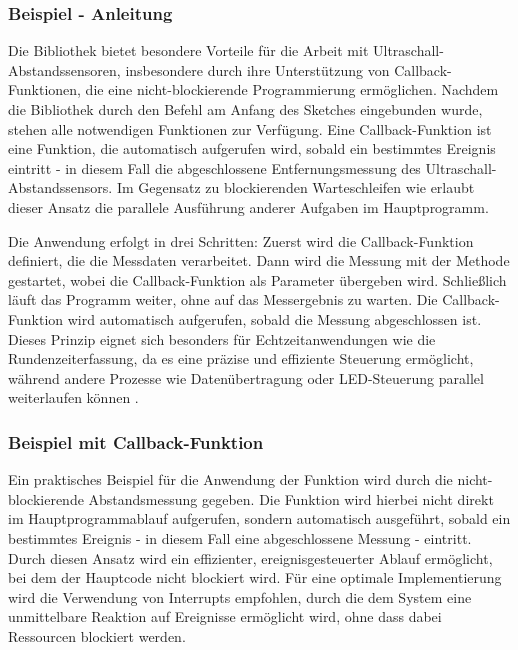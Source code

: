 \subsubsection{Beispiel  - Anleitung}
Die Bibliothek  bietet besondere Vorteile für die Arbeit mit Ultraschall-Abstandssensoren, insbesondere durch ihre Unterstützung von Callback-Funktionen, die eine nicht-blockierende Programmierung ermöglichen. Nachdem die Bibliothek durch den Befehl  am Anfang des Sketches eingebunden wurde, stehen alle notwendigen Funktionen zur Verfügung. Eine Callback-Funktion ist eine Funktion, die automatisch aufgerufen wird, sobald ein bestimmtes Ereignis eintritt - in diesem Fall die abgeschlossene Entfernungsmessung des Ultraschall-Abstandssensors. Im Gegensatz zu blockierenden Warteschleifen wie  erlaubt dieser Ansatz die parallele Ausführung anderer Aufgaben im Hauptprogramm.

Die Anwendung erfolgt in drei Schritten: Zuerst wird die Callback-Funktion definiert, die die Messdaten verarbeitet. Dann wird die Messung mit der Methode  gestartet, wobei die Callback-Funktion als Parameter übergeben wird. Schließlich läuft das Programm weiter, ohne auf das Messergebnis zu warten. Die Callback-Funktion wird automatisch aufgerufen, sobald die Messung abgeschlossen ist. Dieses Prinzip eignet sich besonders für Echtzeitanwendungen wie die Rundenzeiterfassung, da es eine präzise und effiziente Steuerung ermöglicht, während andere Prozesse wie Datenübertragung oder LED-Steuerung parallel weiterlaufen können \cite{Margolis:2019}.

\subsubsection{Beispiel  mit Callback-Funktion}

Ein praktisches Beispiel für die Anwendung der Funktion   wird durch die nicht-blockierende Abstandsmessung gegeben. Die Funktion   wird hierbei nicht direkt im Hauptprogrammablauf aufgerufen, sondern automatisch ausgeführt, sobald ein bestimmtes Ereignis - in diesem Fall eine abgeschlossene Messung - eintritt. Durch diesen Ansatz wird ein effizienter, ereignisgesteuerter Ablauf ermöglicht, bei dem der Hauptcode nicht blockiert wird. Für eine optimale Implementierung wird die Verwendung von Interrupts empfohlen, durch die dem System eine unmittelbare Reaktion auf Ereignisse ermöglicht wird, ohne dass dabei Ressourcen blockiert werden.


